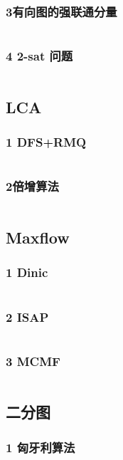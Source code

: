 \documentclass{article}
\begin{document}
\subsubsection{3有向图的强联通分量}
\inputminted{c++}{/home/zzuzxy/t3/ACM-template/3 图论/DFS/3有向图的强联通分量.cpp}
\subsubsection{4 2-sat 问题}
\inputminted{c++}{/home/zzuzxy/t3/ACM-template/3 图论/DFS/4 2-sat 问题.cpp}
\subsection{LCA}
\subsubsection{1 DFS+RMQ}
\inputminted{c++}{/home/zzuzxy/t3/ACM-template/3 图论/LCA/1 DFS+RMQ.cpp}
\subsubsection{2倍增算法}
\inputminted{c++}{/home/zzuzxy/t3/ACM-template/3 图论/LCA/2倍增算法.cpp}
\subsection{Maxflow}
\subsubsection{1 Dinic}
\inputminted{c++}{/home/zzuzxy/t3/ACM-template/3 图论/Maxflow/1 Dinic.cpp}
\subsubsection{2 ISAP}
\inputminted{c++}{/home/zzuzxy/t3/ACM-template/3 图论/Maxflow/2 ISAP.cpp}
\subsubsection{3 MCMF}
\inputminted{c++}{/home/zzuzxy/t3/ACM-template/3 图论/Maxflow/3 MCMF.cpp}
\subsection{二分图}
\subsubsection{1 匈牙利算法}
\inputminted{c++}{/home/zzuzxy/t3/ACM-template/3 图论/二分图/1 匈牙利算法.cpp}
\end{document}
